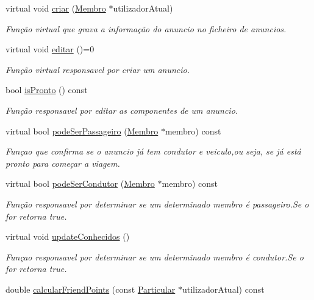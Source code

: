 \begin{DoxyCompactItemize}
virtual void \hyperlink{class_anuncio_a00fb20c3afcd57ef4edc07a09526bde4}{criar} (\hyperlink{class_membro}{Membro} $\ast$utilizador\+Atual)
\begin{DoxyCompactList}\small\item\em Função virtual que grava a informação do anuncio no ficheiro de anuncios. \end{DoxyCompactList}\item 
virtual void \hyperlink{class_anuncio_a82600e3de68746059d60206df6ceee56}{editar} ()=0
\begin{DoxyCompactList}\small\item\em Função virtual responsavel por criar um anuncio. \end{DoxyCompactList}\item 
bool \hyperlink{class_anuncio_a88bacb9aa1be4db0dfc8b8ce0c04b593}{is\+Pronto} () const 
\begin{DoxyCompactList}\small\item\em Função responsavel por editar as componentes de um anuncio. \end{DoxyCompactList}\item 
virtual bool \hyperlink{class_anuncio_a3267758a53d30c2a825ddf7e7cd3d8bd}{pode\+Ser\+Passageiro} (\hyperlink{class_membro}{Membro} $\ast$membro) const 
\begin{DoxyCompactList}\small\item\em Funçao que confirma se o anuncio já tem condutor e veiculo,ou seja, se já está pronto para começar a viagem. \end{DoxyCompactList}\item 
virtual bool \hyperlink{class_anuncio_ab2d7036cd0fbfd2c0eb8078006ca836e}{pode\+Ser\+Condutor} (\hyperlink{class_membro}{Membro} $\ast$membro) const 
\begin{DoxyCompactList}\small\item\em Função responsavel por determinar se um determinado membro é passageiro.\+Se o for retorna true. \end{DoxyCompactList}\item 
virtual void \hyperlink{class_anuncio_aedc37e812bc9aa7ca401716c1326cfb5}{update\+Conhecidos} ()
\begin{DoxyCompactList}\small\item\em Funçao responsavel por determinar se um determinado membro é condutor.\+Se o for retorna true. \end{DoxyCompactList}\item 
double \hyperlink{class_anuncio_a3a56180c8250d42d8c4d5ae4d834634b}{calcular\+Friend\+Points} (const \hyperlink{class_particular}{Particular} $\ast$utilizador\+Atual) const 

\end{DoxyCompactItemize}
